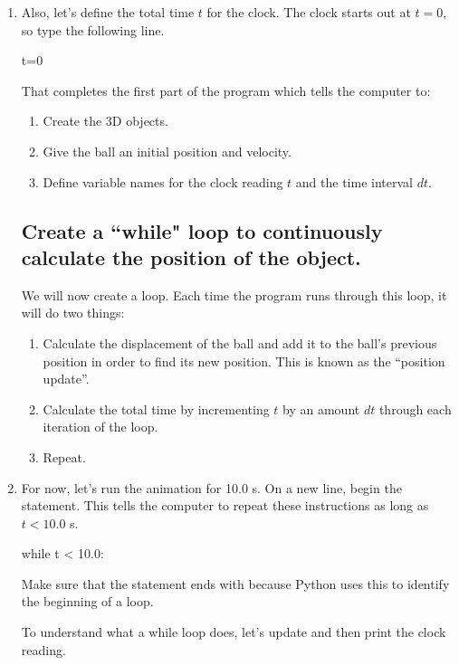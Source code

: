 \begin{enumerate}
\item Also, let's define the total time $t$ for the clock. The clock starts out at $t=0$, so type the following line.

\begin{myvpython}
t=0
\end{myvpython}

That completes the first part of the program which tells the computer to:

	\begin{enumerate}
		\item Create the 3D objects.
		\item Give the ball an initial position and velocity.
		\item Define variable names for the clock reading $t$ and the time interval $dt$.
	\end{enumerate}
	
\subsection*{Create a ``while" loop to continuously calculate the position of the object.}

We will now create a  loop. Each time the program runs through this loop, it will do two things:

	\begin{enumerate}
		\item Calculate the displacement of the ball and add it to the ball's previous position in order to find its new position. This is known as the ``position update''.
		\item Calculate the total time by incrementing $t$ by an amount $dt$ through each iteration of the loop.
		\item Repeat.
	\end{enumerate}

	\item For now, let's run the animation for 10.0 s. On a new line, begin the  statement. This tells the computer to repeat these instructions as long as $t < 10.0$ s.
	
\begin{myvpython}
while t < 10.0:
\end{myvpython}
	
	Make sure that the  statement ends with \type{:} because Python uses this to identify the beginning of a loop. 
	
	To understand what a while loop does, let's update and then  print the clock reading.


\end{enumerate}
